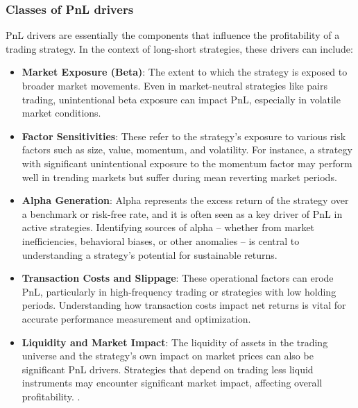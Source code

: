 \subsubsection{Classes of PnL drivers}
\label{sec:classes-pnl-drivers}
PnL drivers are essentially the components that influence the profitability of a trading strategy. In the context of long-short strategies, these drivers can include:
\begin{itemize}
    \item \textbf{Market Exposure (Beta)}: The extent to which the strategy is exposed to broader market movements. Even in market-neutral strategies like pairs trading, unintentional beta exposure can impact PnL, especially in volatile market conditions. \cite{sharpe_1964}
    \item \textbf{Factor Sensitivities}: These refer to the strategy's exposure to various risk factors such as size, value, momentum, and volatility. For instance, a strategy with significant unintentional exposure to the momentum factor may perform well in trending markets but suffer during mean reverting market periods. \cite{asness_moskowitz_lasse_pedersen_2013}
    \item \textbf{Alpha Generation}: Alpha represents the excess return of the strategy over a benchmark or risk-free rate, and it is often seen as a key driver of PnL in active strategies. Identifying sources of alpha -- whether from market inefficiencies, behavioral biases, or other anomalies -- is central to understanding a strategy's potential for sustainable returns. \cite{feibel_2003}
    \item \textbf{Transaction Costs and Slippage}: These operational factors can erode PnL, particularly in high-frequency trading or strategies with low holding periods. Understanding how transaction costs impact net returns is vital for accurate performance measurement and optimization. \cite{gerhold_guasoni_muhle_2013}
    \item \textbf{Liquidity and Market Impact}: The liquidity of assets in the trading universe and the strategy's own impact on market prices can also be significant PnL drivers. Strategies that depend on trading less liquid instruments may encounter significant market impact, affecting overall profitability. \cite{tarun_chordia_roll_avanidhar_subrahmanyam_2001}.
\end{itemize}

